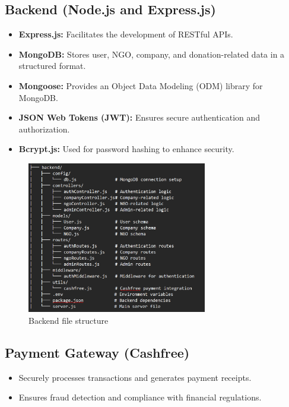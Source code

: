 \subsection{Backend (Node.js and Express.js)}
\begin{itemize}
    \item \textbf{Express.js:} Facilitates the development of RESTful APIs.
    \item \textbf{MongoDB:} Stores user, NGO, company, and donation-related data in a structured format.
    \item \textbf{Mongoose:} Provides an Object Data Modeling (ODM) library for MongoDB.
    \item \textbf{JSON Web Tokens (JWT):} Ensures secure authentication and authorization.
    \item \textbf{Bcrypt.js:} Used for password hashing to enhance security.
\end{itemize}
\begin{figure}[h]
    \centering
    \includegraphics[width=0.7\textwidth]{images/backend_file_structure.png}
    \caption{Backend file structure}
    \label{fig:backend file structure}
\end{figure}

\subsection{Payment Gateway (Cashfree)}
\begin{itemize}
    \item Securely processes transactions and generates payment receipts.
    \item Ensures fraud detection and compliance with financial regulations.
\end{itemize}

